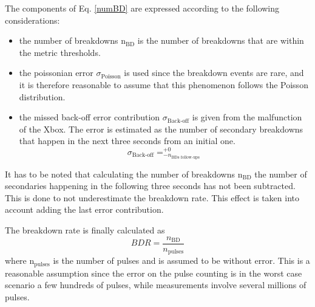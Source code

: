 The components of Eq. \ref{numBD} are expressed according to the following considerations:
\begin{itemize}
\item the number of breakdowns n$_{\text{BD}}$ is the number of breakdowns that are within the metric thresholds.  
\item the poissonian error $\sigma_{\text{Poisson}}$ is used since the breakdown events are rare, and it is therefore reasonable to assume that this phenomenon follows the Poisson distribution.
\item the missed back-off error contribution $ \sigma_{\text{Back-off}}$ is given from the malfunction of the Xbox. The error is estimated as the number of secondary breakdowns that happen in the next three seconds from an initial one. 
\begin{equation}
\sigma_{\text{Back-off}} = _{- n_{\text{BDs follow-ups}}}^{+ 0}
\end{equation}
\end{itemize}
It has to be noted that calculating the number of breakdowns n$_{\text{BD}}$ the number of secondaries happening in the following three seconds has not been subtracted. This is done to not underestimate the breakdown rate. This effect is taken into account adding the last error contribution.


The breakdown rate is finally calculated as
\begin{equation}
BDR = \frac{n_{\text{BD}}}{n_{\text{pulses}}}
\end{equation}
where n$_{\text{pulses}}$ is the number of pulses and is assumed to be without error. This is a reasonable assumption since the error on the pulse counting is in the worst case scenario a few hundreds of pulses, while measurements involve several millions of pulses.


